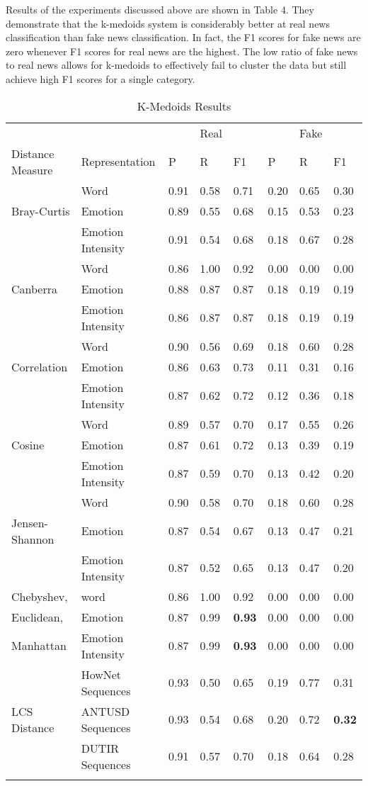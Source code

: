 \documentclass [11pt, proquest] {uwthesis}[2020/02/24]
\begin{document}
Results of the experiments discussed above are shown in Table 4. They demonstrate that the k-medoids system is considerably better at real news classification than fake news classification. In fact, the F1 scores for fake news are zero whenever F1 scores for real news are the highest. The low ratio of fake news to real news allows for k-medoids to effectively fail to cluster the data but still achieve high F1 scores for a single category.
\begin{longtable}{p{4cm}p{4cm}p{1cm}p{1cm}p{1cm}p{1cm}p{1cm}p{1cm}}
 &&&Real&&&Fake\\
 Distance Measure&Representation&P&R&F1&P&R&F1\\
 \hline
  &Word&0.91&0.58&0.71&0.20&0.65&0.30\\
Bray-Curtis&Emotion&0.89&0.55&0.68&0.15&0.53&0.23\\
 &Emotion Intensity&0.91&0.54&0.68&0.18&0.67&0.28\\
  \hline
  &Word&0.86&1.00&0.92&0.00&0.00&0.00\\
Canberra&Emotion&0.88&0.87&0.87&0.18&0.19&0.19\\
 &Emotion Intensity&0.86&0.87&0.87&0.18&0.19&0.19\\
 \hline
  &Word&0.90&0.56&0.69&0.18&0.60&0.28\\
Correlation&Emotion&0.86&0.63&0.73&0.11&0.31&0.16\\
 &Emotion Intensity&0.87&0.62&0.72&0.12&0.36&0.18\\
 \hline
  &Word&0.89&0.57&0.70&0.17&0.55&0.26\\
Cosine&Emotion&0.87&0.61&0.72&0.13&0.39&0.19\\
 &Emotion Intensity&0.87&0.59&0.70&0.13&0.42&0.20\\
 \hline
   &Word&0.90&0.58&0.70&0.18&0.60&0.28\\
Jensen-Shannon&Emotion&0.87&0.54&0.67&0.13&0.47&0.21\\
 &Emotion Intensity&0.87&0.52&0.65&0.13&0.47&0.20\\
 \hline
 Chebyshev,&word&0.86&1.00&0.92&0.00&0.00&0.00\\
Euclidean,&Emotion&0.87&0.99&\textbf{0.93}&0.00&0.00&0.00\\
 Manhattan&Emotion Intensity&0.87&0.99&\textbf{0.93}&0.00&0.00&0.00\\
 \hline
&HowNet Sequences&0.93&0.50&0.65&0.19&0.77&0.31\\
 LCS Distance&ANTUSD Sequences&0.93&0.54&0.68&0.20&0.72&\textbf{0.32}\\
&DUTIR Sequences&0.91&0.57&0.70&0.18&0.64&0.28\\
 \hline
 \caption{K-Medoids Results}
\end{longtable}
\end{document}
